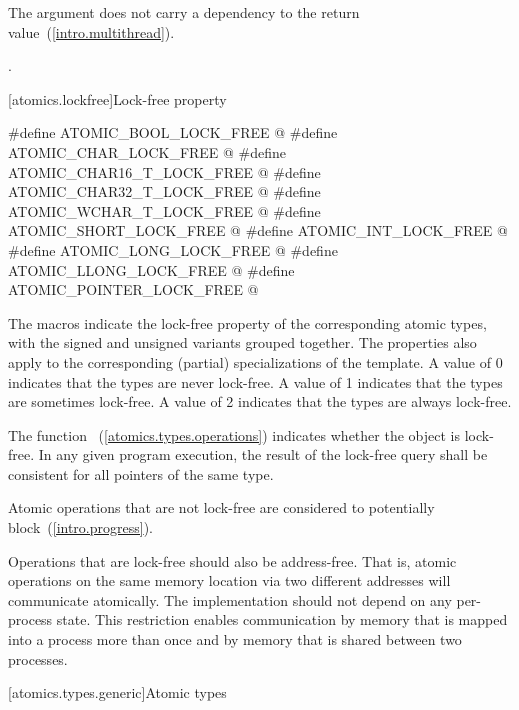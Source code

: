 \begin{itemdescr}
\pnum
\effects The argument does not carry a dependency to the return
value~(\ref{intro.multithread}).

\pnum
\returns {}.
\end{itemdescr}


[atomics.lockfree]{Lock-free property}

\begin{codeblock}
#define ATOMIC_BOOL_LOCK_FREE @\unspec@
#define ATOMIC_CHAR_LOCK_FREE @\unspec@
#define ATOMIC_CHAR16_T_LOCK_FREE @\unspec@
#define ATOMIC_CHAR32_T_LOCK_FREE @\unspec@
#define ATOMIC_WCHAR_T_LOCK_FREE @\unspec@
#define ATOMIC_SHORT_LOCK_FREE @\unspec@
#define ATOMIC_INT_LOCK_FREE @\unspec@
#define ATOMIC_LONG_LOCK_FREE @\unspec@
#define ATOMIC_LLONG_LOCK_FREE @\unspec@
#define ATOMIC_POINTER_LOCK_FREE @\unspec@
\end{codeblock}

\pnum
The  macros indicate the lock-free property of the
corresponding atomic types, with the signed and unsigned variants grouped
together. The properties also apply to the corresponding (partial) specializations of the
 template. A value of 0 indicates that the types are never
lock-free. A value of 1 indicates that the types are sometimes lock-free. A
value of 2 indicates that the types are always lock-free.

\pnum
The function ~(\ref{atomics.types.operations})
indicates whether the object is lock-free. In any given program execution, the
result of the lock-free query shall be consistent for all pointers of the same
type.

\pnum
Atomic operations that are not lock-free are considered to potentially
block~(\ref{intro.progress}).

\pnum
\begin{note} Operations that are lock-free should also be address-free. That is,
atomic operations on the same memory location via two different addresses will
communicate atomically. The implementation should not depend on any
per-process state. This restriction enables communication  by memory that is
mapped into a process more than once and by memory that is shared between two
processes. \end{note}

[atomics.types.generic]{Atomic types}

